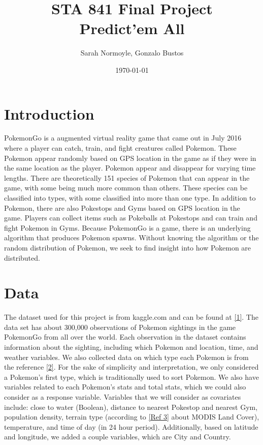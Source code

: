 \documentclass{article}
\begin{document}
\title{STA 841 Final Project \\ Predict'em All}
\author{Sarah Normoyle, Gonzalo Bustos}
\date{\today}
\maketitle


\section{Introduction}

PokemonGo is a augmented virtual reality game that came out in July 2016 where a player can catch, train, and fight creatures called Pokemon. These Pokemon appear randomly based on GPS location in the game as if they were in the same location as the player. Pokemon appear and disappear for varying time lengths. There are theoretically 151 species of Pokemon that can appear in the game, with some being much more common than others. These species can be classified into types, with some classified into more than one type. In addition to Pokemon, there are also Pokestops and Gyms based on GPS location in the game. Players can collect items such as Pokeballs at Pokestops and can train and fight Pokemon in Gyms. Because PokemonGo is a game, there is an underlying algorithm that produces Pokemon spawns. Without knowing the algorithm or the random distribution of Pokemon, we seek to find insight into how Pokemon are distributed. 


\section{Data}

The dataset used for this project is from kaggle.com and can be found at \hyperlink{Ref1}{[1]}.  The data set has about 300,000 observations of Pokemon sightings in the game PokemonGo from all over the world. Each observation in the dataset contains information about the sighting, including which Pokemon and location, time, and weather variables. We also collected data on which type each Pokemon is from the reference \hyperlink{Ref2}{[2]}. For the sake of simplicity and interpretation, we only considered a Pokemon's first type, which is traditionally used to sort Pokemon. We also have variables related to each Pokemon's stats and total stats, which we could also consider as a response variable. Variables that we will consider as covariates include: close to water (Boolean), distance to nearest Pokestop and nearest Gym, population density, terrain type (according to \hyperlink{Ref3}{[Ref 3]} about MODIS Land Cover), temperature, and time of day (in 24 hour period). Additionally, based on latitude and longitude, we added a couple variables, which are City and Country.
\end{document}
